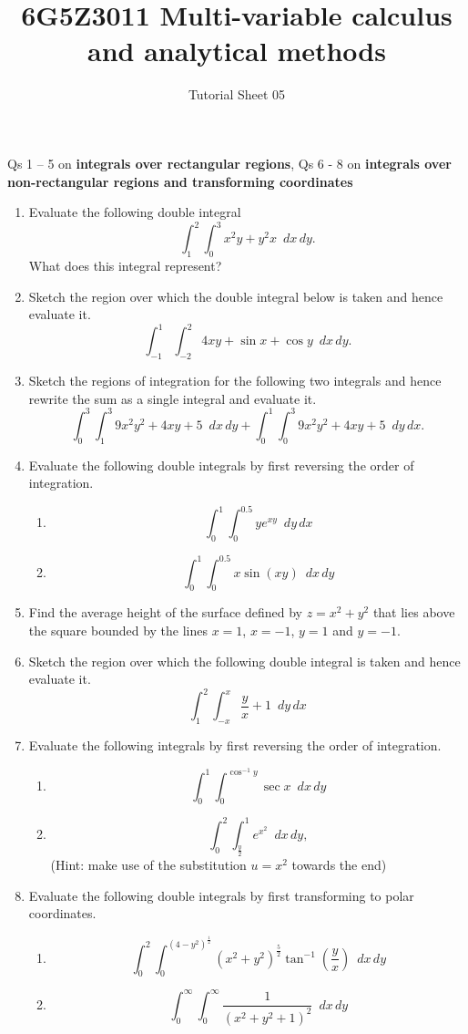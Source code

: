 \documentclass[a4paper]{amsart}
\begin{document}
\title{6G5Z3011 Multi-variable calculus and analytical methods}
\author{Tutorial Sheet 05}
\maketitle

Qs 1 -- 5 on \textbf{integrals over rectangular regions}, Qs 6 - 8 on \textbf{integrals over non-rectangular regions and transforming coordinates}
\begin{enumerate}
    \item
Evaluate the following double integral
$$\int_1^2  \int_0^3 x^2y + y^2 x \, \,\,  dx \, dy .$$
What does this integral represent?
\item
Sketch the region over which the double integral below is taken and hence evaluate it.
$$\int_{-1}^1 \int_{-2}^2 4xy + \sin x + \cos y \,\,\,  dx \, dy.$$
\item
Sketch the regions of integration for the following two integrals and hence rewrite the sum as a single integral and evaluate it.
$$ \int_0^3 \int_1^3 9x^2 y^2 + 4xy + 5 \, \, \, dx \, dy +
\int_0^1 \int_0^3 9x^2 y^2 + 4xy + 5 \, \, \, dy \, dx .$$
\item
Evaluate the following double integrals by first reversing the order of integration.
\begin{enumerate}
\item
$$ \int_0^1 \int_0^{0.5} y e^{xy} \, \, \, dy \, dx $$
\item
$$\int_0^1 \int_0^{0.5} x \sin(xy) \, \, \, dx \, dy $$
\end{enumerate}
\item
Find the average height of the surface defined by $z=x^2 + y^2$ that lies above the square bounded by the lines $x=1$, $x=-1$, $y=1$ and $y=-1$.


\item
Sketch the region over which the following double integral is taken and hence evaluate it.
$$ \int_1^2 \int_{-x}^x \frac{y}{x} + 1 \, \, \, dy \, dx $$
\item
Evaluate the following integrals by first reversing the order of integration.
\begin{enumerate}
\item
$$\int_0^1 \int_0^{\cos^{-1} y} \sec x \, \, \, dx \, dy $$
\item
$$ \int_0^2 \int_{\frac{y}{2}}^1 e^{x^2} \, \, \, dx \, dy,$$
(Hint: make use of the substitution $u=x^2$ towards the end)
\end{enumerate}
\newpage
\item
Evaluate the following double integrals by first transforming to polar coordinates.
\begin{enumerate}
\item
$$\int_0^2 \int_0^{\left ( 4 - y^2 \right )^{\frac{1}{2}}} \left ( x^2 + y^2 \right )^{\frac{5}{2}} \tan^{-1} \left ( \frac{y}{x} \right ) \, \, \, dx \, dy $$

\item
$$\int_0^\infty \int_0^\infty \frac{1}{\left ( x^2 + y^2 + 1 \right )^2} \, \, \, dx \, dy $$
\end{enumerate}
    \end{enumerate}
\end{document}
